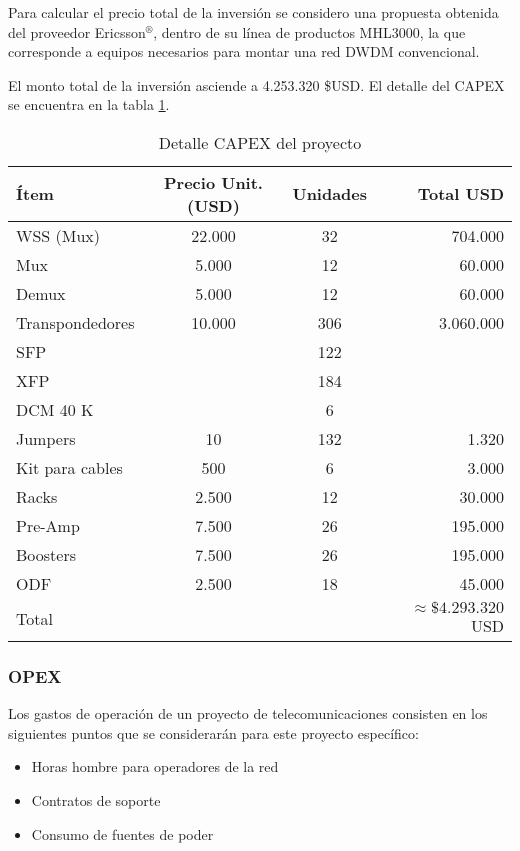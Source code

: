 Para calcular el precio total de la inversión se considero una propuesta obtenida del proveedor \newline Ericsson$^\circledR$, dentro de su línea de productos MHL3000, la que corresponde a equipos necesarios para montar una red DWDM convencional.

El monto total de la inversión asciende a 4.253.320 \$USD. El detalle del CAPEX se encuentra en la tabla \ref{tab:capex}.

\begin{table}[H]
  \centering
  \begin{tabular}{| l | c | c | r |}
    \hline
    \textbf{Ítem} & \textbf{Precio Unit. (USD)} & \textbf{Unidades} & \textbf{Total USD} \\
    \hline
    WSS (Mux) & 22.000 & 32 & 704.000\\
    \hline
    Mux  & 5.000 & 12 & 60.000 \\
    \hline
    Demux & 5.000 & 12 & 60.000 \\
    \hline
    Transpondedores  & 10.000 & 306 & 3.060.000 \\
    \hline
    SFP  & & 122 & \\
    \hline
    XFP  & & 184 & \\
    \hline
    DCM 40 K & & 6 & \\
    \hline
    Jumpers  & 10 & 132 & 1.320 \\
    \hline
    Kit para cables & 500 & 6 & 3.000 \\
    \hline
    Racks  & 2.500 & 12 & 30.000 \\
    \hline
    Pre-Amp & 7.500 & 26 & 195.000\\
    \hline
    Boosters & 7.500 & 26 & 195.000\\
    \hline
    ODF & 2.500 & 18 & 45.000\\
    \hline    
    Total & & & $\approx \$4.293.320$ USD \\
    \hline
  \end{tabular}
  \caption{Detalle CAPEX del proyecto}
  \label{tab:capex}
\end{table}

\subsubsection{OPEX}
\label{sec:opex}

Los gastos de operación de un proyecto de telecomunicaciones consisten en los siguientes puntos que se considerarán para este proyecto específico:
\begin{itemize}
\item Horas hombre para operadores de la red
\item Contratos de soporte
\item Consumo de fuentes de poder
\end{itemize}

